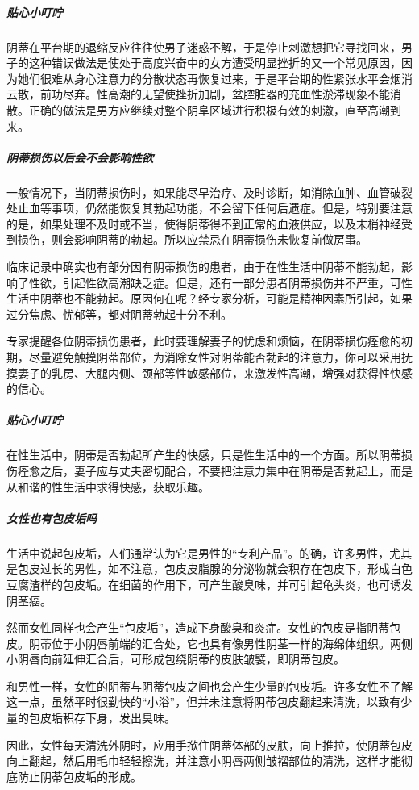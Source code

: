 \begin{enumerate}
\subparagraph{贴心小叮咛}

阴蒂在平台期的退缩反应往往使男子迷惑不解，于是停止刺激想把它寻找回来，男子的这种错误做法是使处于高度兴奋中的女方遭受明显挫折的又一个常见原因，因为她们很难从身心注意力的分散状态再恢复过来，于是平台期的性紧张水平会烟消云散，前功尽弃。性高潮的无望使挫折加剧，盆腔脏器的充血性淤滞现象不能消散。正确的做法是男方应继续对整个阴阜区域进行积极有效的刺激，直至高潮到来。

\subparagraph{阴蒂损伤以后会不会影响性欲}

一般情况下，当阴蒂损伤时，如果能尽早治疗、及时诊断，如消除血肿、血管破裂处止血等事项，仍然能恢复其勃起功能，不会留下任何后遗症。但是，特别要注意的是，如果处理不及时或不当，使得阴蒂得不到正常的血液供应，以及末梢神经受到损伤，则会影响阴蒂的勃起。所以应禁忌在阴蒂损伤未恢复前做房事。

临床记录中确实也有部分因有阴蒂损伤的患者，由于在性生活中阴蒂不能勃起，影响了性欲，引起性欲高潮缺乏症。但是，还有一部分患者阴蒂损伤并不严重，可性生活中阴蒂也不能勃起。原因何在呢？经专家分析，可能是精神因素所引起，如果过分焦虑、忧郁等，都对阴蒂勃起十分不利。

专家提醒各位阴蒂损伤患者，此时要理解妻子的忧虑和烦恼，在阴蒂损伤痊愈的初期，尽量避免触摸阴蒂部位，为消除女性对阴蒂能否勃起的注意力，你可以采用抚摸妻子的乳房、大腿内侧、颈部等性敏感部位，来激发性高潮，增强对获得性快感的信心。

\subparagraph{贴心小叮咛}

在性生活中，阴蒂是否勃起所产生的快感，只是性生活中的一个方面。所以阴蒂损伤痊愈之后，妻子应与丈夫密切配合，不要把注意力集中在阴蒂是否勃起上，而是从和谐的性生活中求得快感，获取乐趣。

\subparagraph{女性也有包皮垢吗}

生活中说起包皮垢，人们通常认为它是男性的“专利产品”。的确，许多男性，尤其是包皮过长的男性，如不注意，包皮皮脂腺的分泌物就会积存在包皮下，形成白色豆腐渣样的包皮垢。在细菌的作用下，可产生酸臭味，并可引起龟头炎，也可诱发阴茎癌。

然而女性同样也会产生“包皮垢”，造成下身酸臭和炎症。女性的包皮是指阴蒂包皮。阴蒂位于小阴唇前端的汇合处，它也具有像男性阴茎一样的海绵体组织。两侧小阴唇向前延伸汇合后，可形成包绕阴蒂的皮肤皱襞，即阴蒂包皮。

和男性一样，女性的阴蒂与阴蒂包皮之间也会产生少量的包皮垢。许多女性不了解这一点，虽然平时很勤快的“小浴”，但并未注意将阴蒂包皮翻起来清洗，以致有少量的包皮垢积存下身，发出臭味。

因此，女性每天清洗外阴时，应用手揿住阴蒂体部的皮肤，向上推拉，使阴蒂包皮向上翻起，然后用毛巾轻轻擦洗，并注意小阴唇两侧皱褶部位的清洗，这样才能彻底防止阴蒂包皮垢的形成。


\end{enumerate}
